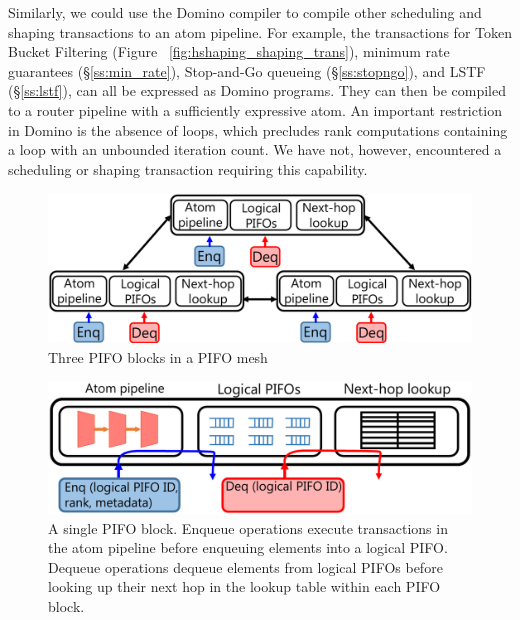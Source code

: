 Similarly, we could use the Domino compiler to compile other scheduling and
shaping transactions to an atom pipeline.  For example, the transactions for
Token Bucket Filtering (Figure ~\ref{fig:hshaping_shaping_trans}), minimum rate
guarantees (\S\ref{ss:min_rate}), Stop-and-Go queueing (\S\ref{ss:stopngo}),
and LSTF (\S\ref{ss:lstf}), can all be expressed as Domino programs. They can
then be compiled to a router pipeline with a sufficiently expressive
atom. An important restriction in Domino is the absence of loops, which
precludes rank computations containing a loop with an unbounded iteration
count. We have not, however, encountered a scheduling or shaping transaction
requiring this capability.

\begin{figure}[!t]
  \centering
  \includegraphics[width=0.6\columnwidth]{pifo_pifo_mesh.pdf}
  \caption{Three PIFO blocks in a PIFO mesh}
  \label{fig:mesh}
\end{figure}

\begin{figure}[!t]
  \centering
  \includegraphics[width=0.6\columnwidth]{pifo_pifo_block.pdf}
  \caption{A single PIFO block. Enqueue operations execute transactions in the
atom pipeline before enqueuing elements into a logical PIFO. Dequeue operations
dequeue elements from logical PIFOs before looking up their next hop in the
lookup table within each PIFO block.} 
  \label{fig:block}
\end{figure}

